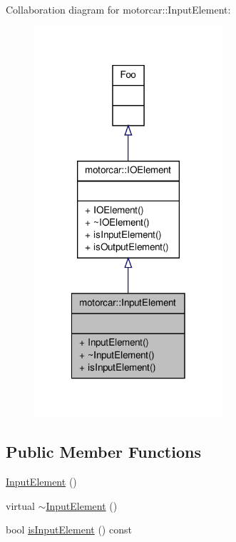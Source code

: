 Collaboration diagram for motorcar\-:\-:Input\-Element\-:
\nopagebreak
\begin{figure}[H]
\begin{center}
\leavevmode
\includegraphics[width=198pt]{classmotorcar_1_1InputElement__coll__graph}
\end{center}
\end{figure}
\subsection*{Public Member Functions}
\begin{DoxyCompactItemize}
\item 
\hyperlink{classmotorcar_1_1InputElement_a7e1f2b5fbda511d4ae48a07764a1ce96}{Input\-Element} ()
\item 
virtual \hyperlink{classmotorcar_1_1InputElement_a79f49cb7f04f2e3bb51cc64cf7eeebfe}{$\sim$\-Input\-Element} ()
\item 
bool \hyperlink{classmotorcar_1_1InputElement_a0ed65040f43f2f699708e424d8d1de48}{is\-Input\-Element} () const 
\end{DoxyCompactItemize}


